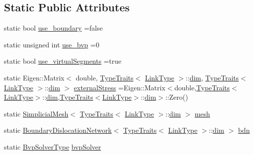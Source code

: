 \subsection*{Static Public Attributes}
\begin{DoxyCompactItemize}
\item 
static bool \hyperlink{structmodel_1_1_dislocation_shared_objects_ac36d30f3f49291da4b0495cea97bf1b6}{use\+\_\+boundary} =false
\item 
static unsigned int \hyperlink{structmodel_1_1_dislocation_shared_objects_a9f12289f60f8fae2261b5bd7ea531401}{use\+\_\+bvp} =0
\item 
static bool \hyperlink{structmodel_1_1_dislocation_shared_objects_a8cdf9f81f79ca2f7740c1f5b379118bd}{use\+\_\+virtual\+Segments} =true
\item 
static Eigen\+::\+Matrix$<$ double, \hyperlink{structmodel_1_1_type_traits}{Type\+Traits}$<$ \hyperlink{_spline_node_base__corder0_8h_ab09ccc0af6ea9402dfef7b0eac55cff3}{Link\+Type} $>$\+::\hyperlink{plot_nd_a_8m_a382f3ca768b275b8d563604f7fc7df73}{dim}, \hyperlink{structmodel_1_1_type_traits}{Type\+Traits}$<$ \hyperlink{_spline_node_base__corder0_8h_ab09ccc0af6ea9402dfef7b0eac55cff3}{Link\+Type} $>$\+::\hyperlink{plot_nd_a_8m_a382f3ca768b275b8d563604f7fc7df73}{dim} $>$ \hyperlink{structmodel_1_1_dislocation_shared_objects_ab38af6b9f62b37c9741434c42582cf7d}{external\+Stress} =Eigen\+::\+Matrix$<$double,\hyperlink{structmodel_1_1_type_traits}{Type\+Traits}$<$\hyperlink{_spline_node_base__corder0_8h_ab09ccc0af6ea9402dfef7b0eac55cff3}{Link\+Type}$>$\+::\hyperlink{plot_nd_a_8m_a382f3ca768b275b8d563604f7fc7df73}{dim},\hyperlink{structmodel_1_1_type_traits}{Type\+Traits}$<$\hyperlink{_spline_node_base__corder0_8h_ab09ccc0af6ea9402dfef7b0eac55cff3}{Link\+Type}$>$\+::\hyperlink{plot_nd_a_8m_a382f3ca768b275b8d563604f7fc7df73}{dim}$>$\+::Zero()
\item 
static \hyperlink{classmodel_1_1_simplicial_mesh}{Simplicial\+Mesh}$<$ \hyperlink{structmodel_1_1_type_traits}{Type\+Traits}$<$ \hyperlink{_spline_node_base__corder0_8h_ab09ccc0af6ea9402dfef7b0eac55cff3}{Link\+Type} $>$\+::\hyperlink{plot_nd_a_8m_a382f3ca768b275b8d563604f7fc7df73}{dim} $>$ \hyperlink{structmodel_1_1_dislocation_shared_objects_a53f7edc298b9b57ec1eef2c3b900c8bf}{mesh}
\item 
static \hyperlink{classmodel_1_1_boundary_dislocation_network}{Boundary\+Dislocation\+Network}$<$ \hyperlink{structmodel_1_1_type_traits}{Type\+Traits}$<$ \hyperlink{_spline_node_base__corder0_8h_ab09ccc0af6ea9402dfef7b0eac55cff3}{Link\+Type} $>$\+::\hyperlink{plot_nd_a_8m_a382f3ca768b275b8d563604f7fc7df73}{dim} $>$ \hyperlink{structmodel_1_1_dislocation_shared_objects_a1ebde927216271979599e324ce29e65a}{bdn}
\item 
static \hyperlink{structmodel_1_1_dislocation_shared_objects_a7562afb5a99947edfee0669cfe78f8b6}{Bvp\+Solver\+Type} \hyperlink{structmodel_1_1_dislocation_shared_objects_ae36c8459eef6497fc82c9650d4b61a3a}{bvp\+Solver}
\end{DoxyCompactItemize}


